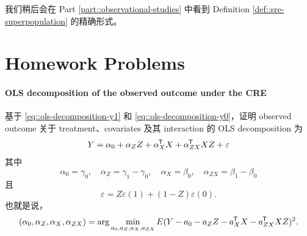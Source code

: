 %  
%  


我们稍后会在 Part \ref{part::observational-studies} 中看到 Definition \ref{def::sre-superpopulation} 的精确形式。 
  

 \section{Homework Problems}
 
\paragraph{OLS decomposition of the observed outcome under the CRE}\label{hw::ols-decompose-cre}

基于 \eqref{eq::ols-decomposition-y1} 和 \eqref{eq::ols-decomposition-y0}，证明 observed outcome 关于 treatment、covariates 及其 interaction 的 OLS decomposition 为
$$
Y= \alpha_0 + \alpha_Z  Z +
\alpha_X ^{\mkern-1.5mu\mathsf{T}} X + \alpha_{ZX} ^{\mkern-1.5mu\mathsf{T}} X Z + \varepsilon 
$$
其中 
$$
\alpha_0 = \gamma_0 ,\quad
\alpha_Z = \gamma_1 - \gamma_0,\quad
\alpha_X  =  \beta_0, \quad
\alpha_{ZX} = \beta_1 - \beta_0
$$
且
$$
\varepsilon  = Z \varepsilon (1) + (1-Z) \varepsilon (0). 
$$
也就是说，
$$
(\alpha_0, \alpha_Z, \alpha_X , \alpha_{ZX} )
=\arg\min_{a_0, a_Z, a_X, a_{ZX}   }  E  (  Y - a_0 - a_Z Z - a_X^{\mkern-1.5mu\mathsf{T}} X -a_{ZX} ^{\mkern-1.5mu\mathsf{T}} X Z)^2.
$$ 
 
